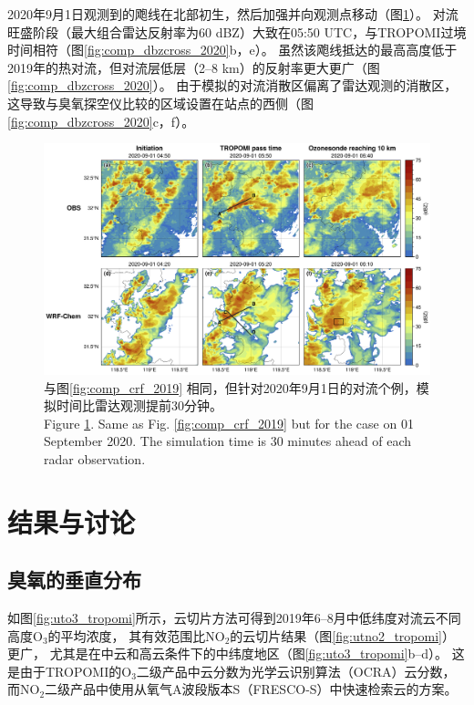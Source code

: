 2020年9月1日观测到的飑线在北部初生，然后加强并向观测点移动（图\ref{fig:comp_crf_2020}）。
对流旺盛阶段（最大组合雷达反射率为60 dBZ）大致在05:50 UTC，与TROPOMI过境时间相符（图\ref{fig:comp_dbzcross_2020}b，e）。
虽然该飑线抵达的最高高度低于2019年的热对流，但对流层低层（2--8 km）的反射率更大更广（图\ref{fig:comp_dbzcross_2020}）。
由于模拟的对流消散区偏离了雷达观测的消散区，这导致与臭氧探空仪比较的区域设置在站点的西侧（图\ref{fig:comp_dbzcross_2020}c，f）。


\begin{figure}[H]
\centering
\includegraphics[width=\textwidth]{./figures/comp_crf_2020.png}
\caption{与图\ref{fig:comp_crf_2019} 相同，但针对2020年9月1日的对流个例，模拟时间比雷达观测提前30分钟。\\
Figure \ref{fig:comp_crf_2020}. Same as Fig. \ref{fig:comp_crf_2019} but for the case on 01 September 2020.
The simulation time is 30 minutes ahead of each radar observation.}
\label{fig:comp_crf_2020}
\end{figure}

\section{结果与讨论}

\subsection{臭氧的垂直分布} \label{sec:o3_profile}

如图\ref{fig:uto3_tropomi}所示，云切片方法可得到2019年6--8月中低纬度对流云不同高度O$_3$的平均浓度，
其有效范围比NO$_2$的云切片结果（图\ref{fig:utno2_tropomi}）更广，
尤其是在中云和高云条件下的中纬度地区（图\ref{fig:uto3_tropomi}b--d）。
这是由于TROPOMI的O$_3$二级产品中云分数为光学云识别算法（OCRA）云分数，而NO$_2$二级产品中使用从氧气A波段版本S（FRESCO-S）中快速检索云的方案。


